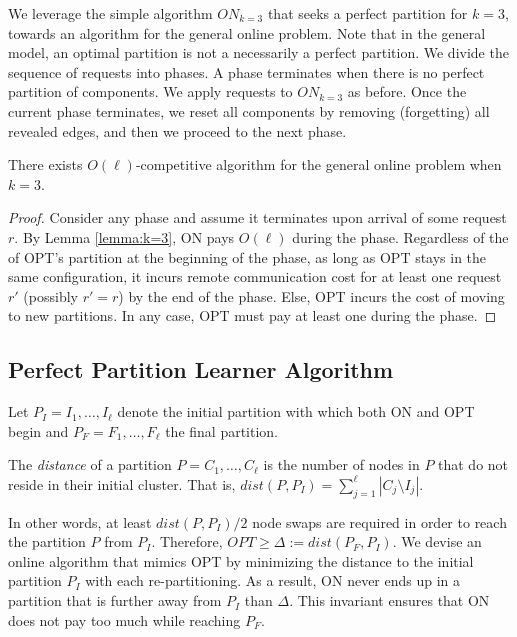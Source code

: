 We leverage the simple algorithm $ON_{k=3}$ that seeks a perfect partition for $k=3$,
towards an algorithm for the general online problem.
Note that in the general model,
an optimal partition is not a necessarily a perfect partition.
We divide the sequence of requests into phases.
A phase terminates when there is no perfect partition of components.
We apply requests to $ON_{k=3}$ as before. 
Once the current phase terminates,
we reset all components by removing (forgetting) all revealed edges,
 and then we proceed to the next phase.

\begin{corollary} \label{cor:k=3}
	There exists $O(\ell)$-competitive  algorithm for the general online problem when $k=3$. 
\end{corollary}
\begin{proof}
	Consider any phase and assume it terminates upon arrival of some request $r$.
	 By Lemma  \ref{lemma:k=3},
	ON pays $O(\ell)$ during the phase.
	Regardless of the of OPT's partition at the beginning of the phase,
	as long as OPT stays in the same configuration,
	 it incurs remote communication cost for at least one request $r'$ (possibly $r'=r$) by the end of the phase.
	 Else,
	 OPT incurs the cost of moving to new partitions.
	 In any case,
	 OPT must pay at least one during the phase.
\end{proof}
	
\subsection{Perfect Partition Learner Algorithm}



Let $P_I = I_1, \dots, I_{\ell}$ denote the initial partition with which both ON and OPT begin and
$P_F = F_1, \dots, F_{\ell}$ the final partition.
\begin{definition}	\label{def:dist}
	The \emph{distance} of a partition $P = C_1, \dots, C_{\ell}$ is the number of nodes in $P$ that do not reside in their initial cluster.
	That is,
	$dist(P, P_I) = \sum_{j=1}^{\ell} | C_j \setminus I_j |$. 
\end{definition}

In other words,
at least $dist(P, P_I)/2$ node swaps are required in order to reach the partition $P$ from $P_I$.
Therefore,
$OPT \geq \Delta:= dist(P_F, P_I) $.
We devise an online algorithm that mimics OPT by minimizing the distance to the initial partition $P_I$ with each re-partitioning.
As a result,
ON never ends up in a partition that is further away from $P_I$ than $\Delta$.
This invariant ensures that ON does not pay too much while reaching $P_F$.

